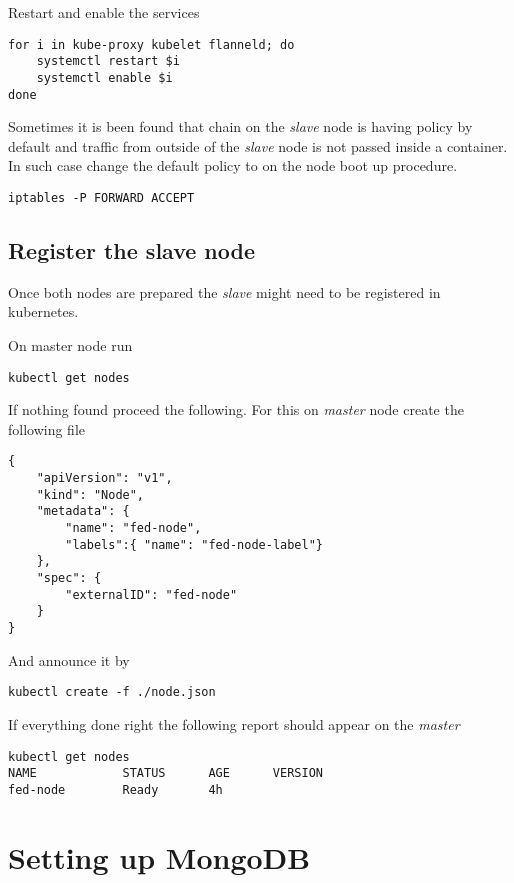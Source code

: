 Restart and enable the services

\begin{lstlisting}
for i in kube-proxy kubelet flanneld; do
    systemctl restart $i
    systemctl enable $i
done
\end{lstlisting}

Sometimes it is been found that  chain on
the \emph{slave} node is having  policy by default
and traffic from outside of the \emph{slave} node is not
passed inside a container. In such case change the default
policy to  on the node boot up procedure.

\begin{lstlisting}
iptables -P FORWARD ACCEPT
\end{lstlisting}

\subsection{Register the slave node}
\label{subsec:setup-kuber-register-slave}

Once both nodes are prepared the \emph{slave} might need
to be registered in kubernetes.

On master node run

\begin{lstlisting}
kubectl get nodes
\end{lstlisting}

If nothing found proceed the following. For this on
\emph{master} node create the following 
file

\begin{lstlisting}
{
    "apiVersion": "v1",
    "kind": "Node",
    "metadata": {
        "name": "fed-node",
        "labels":{ "name": "fed-node-label"}
    },
    "spec": {
        "externalID": "fed-node"
    }
}
\end{lstlisting}

And announce it by
\begin{lstlisting}
kubectl create -f ./node.json
\end{lstlisting}

If everything done right the following report should
appear on the \emph{master} 

\begin{lstlisting}
kubectl get nodes
NAME            STATUS      AGE      VERSION
fed-node        Ready       4h
\end{lstlisting}

\section{Setting up MongoDB}
\label{sec:setup-mongodb}

